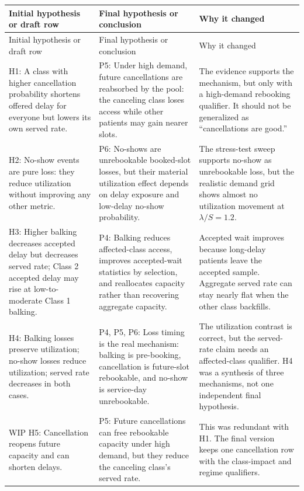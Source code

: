 \documentclass[11pt]{article}
\begin{document}
\begin{longtable}{P{0.30\textwidth} P{0.31\textwidth} P{0.31\textwidth}}
\toprule
Initial hypothesis or draft row & Final hypothesis or conclusion & Why it changed \\
\midrule
\endfirsthead
\toprule
Initial hypothesis or draft row & Final hypothesis or conclusion & Why it changed \\
\midrule
\endhead
H1: A class with higher cancellation probability shortens offered delay for
everyone but lowers its own served rate. &
P5: Under high demand, future cancellations are reabsorbed by the pool: the
canceling class loses access while other patients may gain nearer slots. &
The evidence supports the mechanism, but only with a high-demand rebooking
qualifier. It should not be generalized as ``cancellations are good.'' \\

H2: No-show events are pure loss: they reduce utilization without improving any
other metric. &
P6: No-shows are unrebookable booked-slot losses, but their material utilization
effect depends on delay exposure and low-delay no-show probability. &
The stress-test sweep supports no-show as unrebookable loss, but the realistic
demand grid shows almost no utilization movement at $\lambda/S=1.2$. \\

H3: Higher balking decreases accepted delay but decreases served rate; Class 2
accepted delay may rise at low-to-moderate Class 1 balking. &
P4: Balking reduces affected-class access, improves accepted-wait statistics by
selection, and reallocates capacity rather than recovering aggregate capacity. &
Accepted wait improves because long-delay patients leave the accepted sample.
Aggregate served rate can stay nearly flat when the other class backfills. \\

H4: Balking losses preserve utilization; no-show losses reduce utilization;
served rate decreases in both cases. &
P4, P5, P6: Loss timing is the real mechanism: balking is pre-booking,
cancellation is future-slot rebookable, and no-show is service-day
unrebookable. &
The utilization contrast is correct, but the served-rate claim needs an
affected-class qualifier. H4 was a synthesis of three mechanisms, not one
independent final hypothesis. \\

WIP H5: Cancellation reopens future capacity and can shorten delays. &
P5: Future cancellations can free rebookable capacity under high demand, but
they reduce the canceling class's served rate. &
This was redundant with H1. The final version keeps one cancellation row with
the class-impact and regime qualifiers. \\


\end{longtable}
\end{document}
